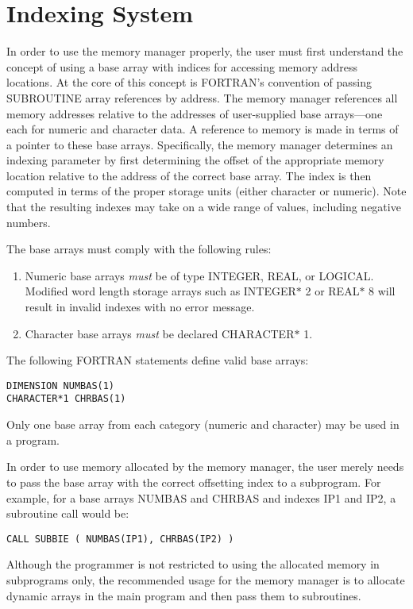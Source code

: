 \section{Indexing System}
In order to use the memory manager properly, the user must first understand
the concept of using a base array with indices for accessing memory
address locations.
At the core of this concept is FORTRAN's convention of passing
SUBROUTINE array references by address.
The memory manager references all memory addresses relative
to the addresses of user-supplied base
arrays---one each for numeric and character data. A reference
to memory is made in terms of a pointer to these base arrays.
Specifically,
the memory manager determines an indexing parameter by first determining the
offset of the appropriate memory location relative to the address
of the correct base
array.
The index is then computed in terms of the proper storage units
(either character or numeric).
Note that the resulting
indexes may take on a wide range of
values, including negative numbers.

The base arrays must comply with the following rules:
\begin{enumerate}
\item Numeric base arrays {\em must} be of type INTEGER, REAL, or LOGICAL.  Modified
word length storage arrays such as INTEGER$*$ 2 or REAL$*$ 8 will result
in invalid indexes with no error message.

\item Character base arrays {\em must} be declared CHARACTER$*$ 1.
\end{enumerate}

The following FORTRAN statements define valid base arrays:
\begin{verbatim}
DIMENSION NUMBAS(1)
CHARACTER*1 CHRBAS(1)
\end{verbatim}
Only one base array from each category (numeric and character) may
be used in a program.

In order to use memory allocated by the memory manager, the user merely
needs to pass the base array with the correct offsetting
index to a subprogram.
For example, for a base arrays NUMBAS and CHRBAS
and indexes IP1 and IP2, a subroutine call would be:

\verb+CALL SUBBIE ( NUMBAS(IP1), CHRBAS(IP2) )+

Although the programmer is not restricted to using the allocated memory in
subprograms only, the recommended usage for the memory manager is to
allocate dynamic arrays in the main program and then pass them to
subroutines.


